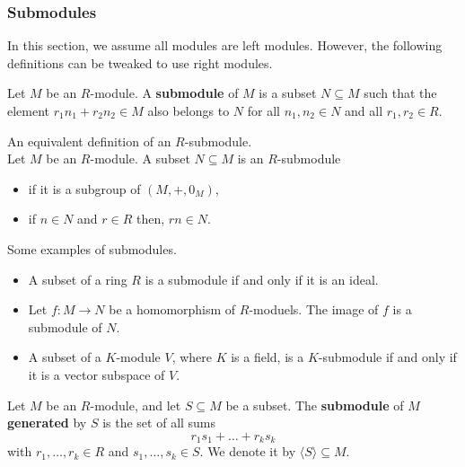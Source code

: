 \documentclass[12pt, a4paper]{article}
\begin{document}
\subsubsection{Submodules}

\begin{mdremark}
    In this section, we assume all modules are left modules. However, the following definitions can be tweaked to use right modules.
\end{mdremark}

\begin{definition}
    Let \(M\) be an \(R\)-module. A \textbf{submodule} of \(M\) is a subset \(N \subseteq M\) such that the element \(r_1n_1+r_2n_2 \in M\) also belongs to \(N\) for all \(n_1,n_2 \in N\) and all \(r_1,r_2 \in R\).
\end{definition}

\begin{mdremark}
    An equivalent definition of an \(R\)-submodule. \\
    Let \(M\) be an \(R\)-module. A subset \(N \subseteq M\) is an \(R\)-submodule
    \begin{itemize}
        \item if it is a subgroup of \((M,+,0_M)\),
        \item if \(n \in N\) and \(r \in R\) then, \(rn \in N\).
    \end{itemize}
\end{mdremark}

\begin{mdexample}
    Some examples of submodules.
    \begin{itemize}
        \item A subset of a ring \(R\) is a submodule if and only if it is an ideal.
        \item Let \(f:M \to N\) be a homomorphism of \(R\)-moduels. The image of \(f\) is a submodule of \(N\).
        \item A subset of a \(K\)-module \(V\), where \(K\) is a field, is a \(K\)-submodule if and only if it is a vector subspace of \(V\).
    \end{itemize}
\end{mdexample}

\begin{definition}
    Let \( M \) be an \( R \)-module, and let \( S \subseteq M \) be a subset. The \textbf{submodule} of \( M \) \textbf{generated} by \( S \) is the set of all sums
    \[ r_1s_1 + \dots + r_ks_k \]
    with \( r_1, \ldots, r_k \in R \) and \( s_1, \ldots, s_k \in S \). We denote it by \( \langle S \rangle \subseteq M \). 
\end{definition}
\end{document}
